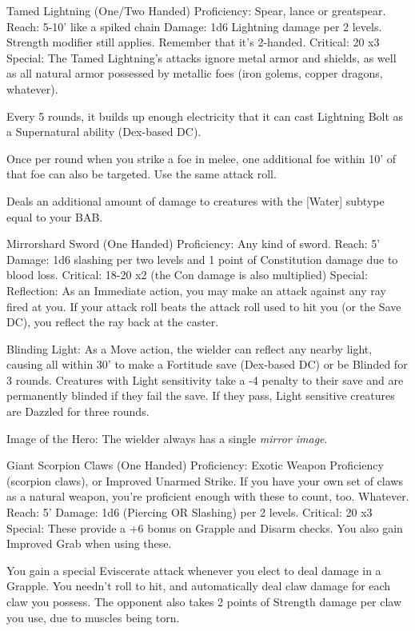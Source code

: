 Tamed Lightning (One/Two Handed)
Proficiency: Spear, lance or greatspear.
Reach: 5-10' like a spiked chain
Damage: 1d6 Lightning damage per 2 levels. Strength modifier still applies. Remember that it's 2-handed.
Critical: 20 x3
Special:
The Tamed Lightning's attacks ignore metal armor and shields, as well as all natural armor possessed by metallic foes (iron golems, copper dragons, whatever).

Every 5 rounds, it builds up enough electricity that it can cast Lightning Bolt as a Supernatural ability (Dex-based DC).

Once per round when you strike a foe in melee, one additional foe within 10' of that foe can also be targeted. Use the same attack roll.

Deals an additional amount of damage to creatures with the [Water] subtype equal to your BAB.


Mirrorshard Sword (One Handed)
Proficiency: Any kind of sword.
Reach: 5'
Damage: 1d6 slashing per two levels and 1 point of Constitution damage due to blood loss.
Critical: 18-20 x2 (the Con damage is also multiplied)
Special:
Reflection: As an Immediate action, you may make an attack against any ray fired at you. If your attack roll beats the attack roll used to hit you (or the Save DC), you reflect the ray back at the caster.

Blinding Light: As a Move action, the wielder can reflect any nearby light, causing all within 30' to make a Fortitude save (Dex-based DC) or be Blinded for 3 rounds. Creatures with Light sensitivity take a -4 penalty to their save and are permanently blinded if they fail the save. If they pass, Light sensitive creatures are Dazzled for three rounds.

Image of the Hero: The wielder always has a single \emph{mirror image}.


Giant Scorpion Claws (One Handed)
Proficiency: Exotic Weapon Proficiency (scorpion claws), or Improved Unarmed Strike. If you have your own set of claws as a natural weapon, you're proficient enough with these to count, too. Whatever.
Reach: 5'
Damage: 1d6 (Piercing OR Slashing) per 2 levels.
Critical: 20 x3
Special:
These provide a +6 bonus on Grapple and Disarm checks. You also gain Improved Grab when using these.

You gain a special Eviscerate attack whenever you elect to deal damage in a Grapple. You needn't roll to hit, and automatically deal claw damage for each claw you possess. The opponent also takes 2 points of Strength damage per claw you use, due to muscles being torn.

